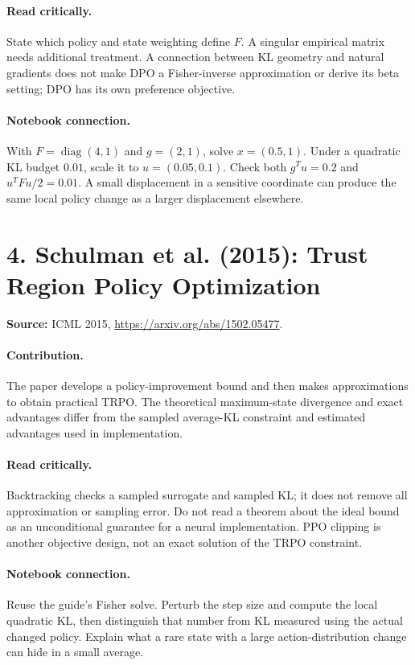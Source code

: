 \documentclass[11pt]{scrartcl}
\begin{document}
\paragraph{Read critically.} State which policy and state weighting define
$F$. A singular empirical matrix needs additional treatment. A connection
between KL geometry and natural gradients does not make DPO a Fisher-inverse
approximation or derive its beta setting; DPO has its own preference objective.

\paragraph{Notebook connection.} With $F=\operatorname{diag}(4,1)$ and
$g=(2,1)$, solve $x=(0.5,1)$. Under a quadratic KL budget $0.01$, scale it to
$u=(0.05,0.1)$. Check both $g^Tu=0.2$ and $u^TFu/2=0.01$.
A small displacement in a sensitive coordinate can produce the same local
policy change as a larger displacement elsewhere.

\section*{4. Schulman et al. (2015): Trust Region Policy Optimization}
\textbf{Source:} ICML 2015, \url{https://arxiv.org/abs/1502.05477}.

\paragraph{Contribution.} The paper develops a policy-improvement bound and
then makes approximations to obtain practical TRPO. The theoretical
maximum-state divergence and exact advantages differ from the sampled
average-KL constraint and estimated advantages used in implementation.

\paragraph{Read critically.} Backtracking checks a sampled surrogate and
sampled KL; it does not remove all approximation or sampling error.
Do not read a theorem about the ideal bound as an unconditional guarantee
for a neural implementation. PPO clipping is another objective design,
not an exact solution of the TRPO constraint.

\paragraph{Notebook connection.} Reuse the guide's Fisher solve. Perturb the
step size and compute the local quadratic KL, then distinguish that number
from KL measured using the actual changed policy. Explain what a rare state
with a large action-distribution change can hide in a small average.
\end{document}
